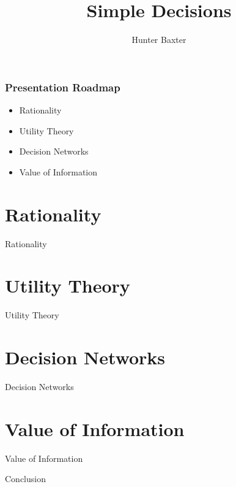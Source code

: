 \documentclass{beamer}
\title{Simple Decisions}
\author{Hunter Baxter}
\begin{document}
\maketitle

\begin{frame}
\frametitle{Presentation Roadmap}
\begin{itemize}
    \item Rationality
    \item Utility Theory 
    \item Decision Networks
    \item Value of Information
\end{itemize}
\end{frame}

\section{Rationality}
\begin{frame}{Rationality}
\end{frame}

\section{Utility Theory}
\begin{frame}{Utility Theory}
\end{frame}

\section{Decision Networks}
\begin{frame}{Decision Networks}
\end{frame}

\section{Value of Information}
\begin{frame}{Value of Information}
\end{frame}

\begin{frame}{Conclusion}
\end{frame}
\end{document}
